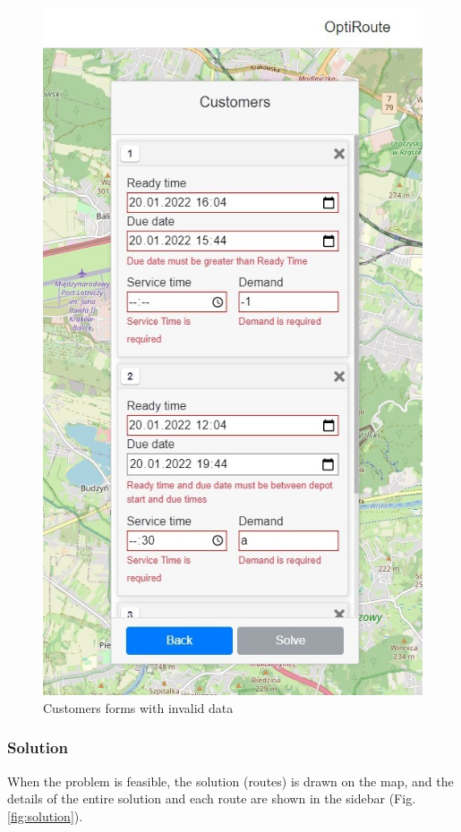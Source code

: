 \documentclass[a4paper,twoside,12pt]{book}
\begin{document}
\begin{figure}[htb]
\centering
\includegraphics[scale=0.7]{images/invalidCustomers_updated.jpg}
\caption{Customers forms with invalid data}
\label{fig:invalidCustomers}
\end{figure}

\subsubsection{Solution}
When the problem is feasible, the solution (routes) is drawn on the map, and the details of the entire solution and each route are shown in the sidebar (Fig. \ref{fig:solution}).
\end{document}
